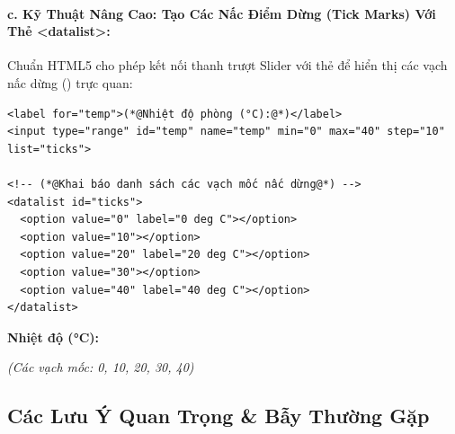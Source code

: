 \paragraph{c. Kỹ Thuật Nâng Cao: Tạo Các Nấc Điểm Dừng (Tick Marks) Với Thẻ <datalist>:}
Chuẩn HTML5 cho phép kết nối thanh trượt Slider với thẻ  để hiển thị các vạch nấc dừng () trực quan:

\begin{codeWindow}
\begin{lstlisting}[language=HTML5]
<label for="temp">(*@Nhiệt độ phòng (°C):@*)</label>
<input type="range" id="temp" name="temp" min="0" max="40" step="10" list="ticks">

<!-- (*@Khai báo danh sách các vạch mốc nấc dừng@*) -->
<datalist id="ticks">
  <option value="0" label="0 deg C"></option>
  <option value="10"></option>
  <option value="20" label="20 deg C"></option>
  <option value="30"></option>
  <option value="40" label="40 deg C"></option>
</datalist>
\end{lstlisting}
\end{codeWindow}

\begin{browserWindow}
\sffamily\small
\textbf{Nhiệt độ (°C):} \quad
{} \quad \textcolor{codeComment}{\small\textit{(Các vạch mốc: 0, 10, 20, 30, 40)}}
\end{browserWindow}

\subsection{Các Lưu Ý Quan Trọng \& Bẫy Thường Gặp}

